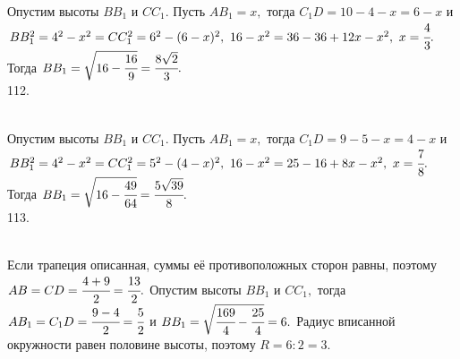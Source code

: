 \documentclass[12pt]{article}
\begin{document}
Опустим высоты $BB_1$ и $CC_1.$ Пусть $AB_1=x,$ тогда $C_1D=10-4-x=6-x$ и $BB_1^2=4^2-x^2=CC_1^2=6^2-(6-x)^2,\ 16-x^2=36-36+12x-x^2,\ x=\cfrac{4}{3}.$ Тогда $BB_1=\sqrt{16-\cfrac{16}{9}}=\cfrac{8\sqrt{2}}{3}.$\\
112. \begin{figure}[ht!]
\end{figure}\\
Опустим высоты $BB_1$ и $CC_1.$ Пусть $AB_1=x,$ тогда $C_1D=9-5-x=4-x$ и $BB_1^2=4^2-x^2=CC_1^2=5^2-(4-x)^2,\ 16-x^2=25-16+8x-x^2,\ x=\cfrac{7}{8}.$ Тогда $BB_1=\sqrt{16-\cfrac{49}{64}}=\cfrac{5\sqrt{39}}{8}.$\\
113. \begin{figure}[ht!]
\end{figure}\\
Если трапеция описанная, суммы её противоположных сторон равны, поэтому $AB=CD=\cfrac{4+9}{2}=\cfrac{13}{2}.$ Опустим высоты $BB_1$ и $CC_1,$ тогда $AB_1=C_1D=\cfrac{9-4}{2}=\cfrac{5}{2}$ и $BB_1=\sqrt{\cfrac{169}{4}-\cfrac{25}{4}}=6.$ Радиус вписанной окружности равен половине высоты, поэтому $R=6:2=3.$\newpage\noindent
\end{document}
